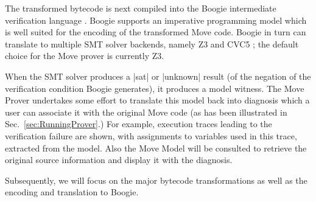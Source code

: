 The transformed bytecode is next compiled into the Boogie intermediate
verification language \cite{BOOGIE}. Boogie supports an imperative programming
model which is well suited for the encoding of the transformed Move code. Boogie
in turn can translate to multiple SMT solver backends, namely Z3 \cite{Z3} and
CVC5 \cite{CVC}; the default choice for the Move prover is currently Z3.

When the SMT solver produces a |sat| or |unknown| result (of the negation of the
verification condition Boogie generates), it produces a model witness. The Move
Prover undertakes some effort to translate this model back into diagnosis which
a user can associate it with the original Move code (as has been illustrated in
Sec.~\ref{sec:RunningProver}.) For example, execution traces leading to the
verification failure are shown, with assignments to variables used in this
trace, extracted from the model. Also the Move Model will be consulted to
retrieve the original source information and display it with the diagnosis.

Subsequently, we will focus on the major bytecode transformations as well as the
encoding and translation to Boogie.


